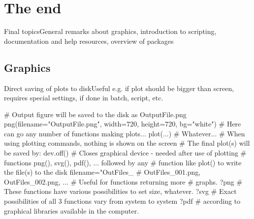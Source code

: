 \documentclass[compress, ucs, xelatex, 11pt, xcolor=svgnames, aspectratio=169,
	hyperref={
		bookmarks=true,
		unicode=true,
		colorlinks=true,
		pdftitle={Molecular data in R},
		plainpages=false,
		pdfauthor={Vojtech Zeisek},
		pdfsubject={Course about phylogeny and evolution in R},
		pdfcreator={XeLaTeX},
		pdfkeywords={R, evolution, phylogeny, molecular data},
		linkcolor=Crimson, %
		anchorcolor=Magenta, %
		citecolor=Magenta, %
		filecolor=Magenta, %
		menucolor=Magenta, %
		urlcolor=DodgerBlue, %
		pdftex},
	url={hyphens, lowtilde} %
	]{beamer}
\begin{document}
\section{The end}

\begin{frame}{Final topics}{General remarks about graphics, introduction to scripting, documentation and help resources, overview of packages}
	\tableofcontents[currentsection, sectionstyle=show/hide, hideothersubsections]
\end{frame}

\subsection{Graphics}

\begin{frame}[fragile]{Direct saving of plots to disk}{Useful e.g. if plot should be bigger than screen, requires special settings, if done in batch, script, etc.}
	\begin{spluscode}
    # Output figure will be saved to the disk as OutputFile.png
    png(filename="OutputFile.png", width=720, height=720, bg="white")
    # Here can go any number of functions making plots...
    plot(...) # Whatever...
    # When using plotting commands, nothing is shown on the screen
    # The final plot(s) will be saved by:
    dev.off() # Closes graphical device - needed after use of plotting
              # functions png(), svg(), pdf(), ... followed by any
              # function like plot() to write the file(s) to the disk
    filename="OutFiles_%
                                 # OutFiles_001.png, OutFiles_002.png, ...
                                 # Useful for functions returning more
                                 # graphs.
    ?png # These functions have various possibilities to set size, whatever.
    ?svg # Exact possibilities of all 3 functions vary from system to system
    ?pdf # according to graphical libraries available in the computer.
	\end{spluscode}
\end{frame}
\end{document}
